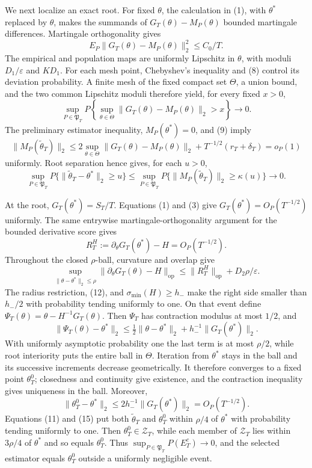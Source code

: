 We next localize an exact root. For fixed \(\theta\), the calculation in (1), with \(\theta^*\) replaced by \(\theta\), makes the summands of \(G_T(\theta)-M_P(\theta)\) bounded martingale differences. Martingale orthogonality gives
\[
 E_P\|G_T(\theta)-M_P(\theta)\|_2^2\le C_0/T.
\tag{8}
\]
The empirical and population maps are uniformly Lipschitz in \(\theta\), with moduli \(D_1/\varepsilon\) and \(KD_1\). For each mesh point, Chebyshev's inequality and (8) control its deviation probability. A finite mesh of the fixed compact set \(\Theta\), a union bound, and the two common Lipschitz moduli therefore yield, for every fixed \(x>0\),
\[
 \sup_{P\in\mathfrak P_T}P\!\left\{\sup_{\theta\in\Theta}
 \|G_T(\theta)-M_P(\theta)\|_2>x\right\}\longrightarrow0.
\tag{9}
\]
The preliminary estimator inequality, \(M_P(\theta^*)=0\), and (9) imply
\[
 \|M_P(\widetilde\theta_T)\|_2
 \le2\sup_{\theta\in\Theta}\|G_T(\theta)-M_P(\theta)\|_2
 +T^{-1/2}(r_T+\delta_T)=o_P(1)
\tag{10}
\]
uniformly. Root separation hence gives, for each \(u>0\),
\[
 \sup_{P\in\mathfrak P_T}P\{\|\widetilde\theta_T-\theta^*\|_2\ge u\}
 \le\sup_{P\in\mathfrak P_T}P\{\|M_P(\widetilde\theta_T)\|_2
 \ge\kappa(u)\}\longrightarrow0.
\tag{11}
\]

At the root, \(G_T(\theta^*)=S_T/T\). Equations (1) and (3) give \(G_T(\theta^*)=O_P(T^{-1/2})\) uniformly. The same entrywise martingale-orthogonality argument for the bounded derivative score gives
\[
 R_T^H:=\partial_\theta G_T(\theta^*)-H=O_P(T^{-1/2}).
\tag{12}
\]
Throughout the closed \(\rho\)-ball, curvature and overlap give
\[
 \sup_{\|\theta-\theta^*\|_2\le\rho}
 \|\partial_\theta G_T(\theta)-H\|_{\mathrm{op}}
 \le\|R_T^H\|_{\mathrm{op}}+D_2\rho/\varepsilon.
\tag{13}
\]
The radius restriction, (12), and \(\sigma_{\min}(H)\ge h_-\) make the right side smaller than \(h_-/2\) with probability tending uniformly to one. On that event define \(\Psi_T(\theta)=\theta-H^{-1}G_T(\theta)\). Then \(\Psi_T\) has contraction modulus at most \(1/2\), and
\[
 \|\Psi_T(\theta)-\theta^*\|_2
 \le\tfrac12\|\theta-\theta^*\|_2+h_-^{-1}\|G_T(\theta^*)\|_2.
\tag{14}
\]
With uniformly asymptotic probability one the last term is at most \(\rho/2\), while root interiority puts the entire ball in \(\Theta\). Iteration from \(\theta^*\) stays in the ball and its successive increments decrease geometrically. It therefore converges to a fixed point \(\theta_T^0\); closedness and continuity give existence, and the contraction inequality gives uniqueness in the ball. Moreover,
\[
 \|\theta_T^0-\theta^*\|_2
 \le2h_-^{-1}\|G_T(\theta^*)\|_2=O_P(T^{-1/2}).
\tag{15}
\]
Equations (11) and (15) put both \(\widetilde\theta_T\) and \(\theta_T^0\) within \(\rho/4\) of \(\theta^*\) with probability tending uniformly to one. Then \(\theta_T^0\in\mathcal Z_T\), while each member of \(\mathcal Z_T\) lies within \(3\rho/4\) of \(\theta^*\) and so equals \(\theta_T^0\). Thus \(\sup_{P\in\mathfrak P_T}P(E_T^c)\to0\), and the selected estimator equals \(\theta_T^0\) outside a uniformly negligible event.

